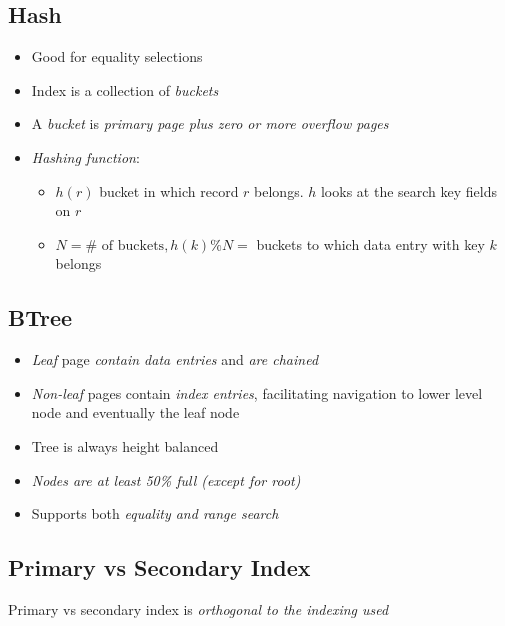   \subsection{Hash}

    \begin{itemize}
      \item Good for equality selections
      \item Index is a collection of \emph{buckets}
      \item A \emph{bucket} is \emph{primary page plus zero or more overflow pages}
      \item \emph{Hashing function}:
      \begin{itemize}
        \item $ h(r) $ bucket in which record $ r $ belongs.
        $ h $ looks at the search key fields on $ r $
        \item $ N = \#\text{ of buckets}, h(k) \% N = $ buckets to which data
        entry with key $ k $ belongs
      \end{itemize}
    \end{itemize}

  \subsection{BTree}

    \begin{itemize}
      \item \emph{Leaf} page \emph{contain data entries} and \emph{are chained}
      \item \emph{Non-leaf} pages contain \emph{index entries}, facilitating navigation
      to lower level node and eventually the leaf node
      \item Tree is always height balanced
      \item \emph{Nodes are at least 50\% full (except for root)}
      \item Supports both \emph{equality and range search}
    \end{itemize}

  \subsection{Primary vs Secondary Index}

    Primary vs secondary index is \emph{orthogonal to the indexing used}

